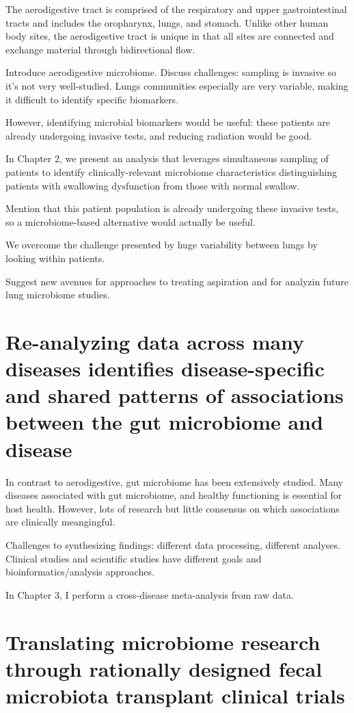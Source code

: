 The aerodigestive tract is comprised of the respiratory and upper gastrointestinal tracts and includes the oropharynx, lungs, and stomach.
Unlike other human body sites, the aerodigestive tract is unique in that all sites are connected and exchange material through bidirectional flow.


Introduce aerodigestive microbiome. Discuss challenges: sampling is invasive so it's not very well-studied. Lungs communities especially are very variable, making it difficult to identify specific biomarkers.

However, identifying microbial biomarkers would be useful: these patients are already undergoing invasive tests, and reducing radiation would be good.

In Chapter 2, we present an analysis that leverages simultaneous sampling of patients to identify clinically-relevant microbiome characteristics distinguishing patients with swallowing dysfunction from those with normal swallow.

Mention that this patient population is already undergoing these invasive tests, so a microbiome-based alternative would actually be useful.

We overcome the challenge presented by huge variability between lungs by looking within patients.

Suggest new avenues for approaches to treating aspiration and for analyzin future lung microbiome studies.

\section{Re-analyzing data across many diseases identifies disease-specific and shared patterns of associations between the gut microbiome and disease}

In contrast to aerodigestive, gut microbiome has been extensively studied. Many diseases associated with gut microbiome, and healthy functioning is essential for host health. However, lots of research but little consensus on which associations are clinically meangingful.

Challenges to synthesizing findings: different data processing, different analyses. Clinical studies and scientific studies have different goals and bioinformatics/analysis approaches.

In Chapter 3, I perform a cross-disease meta-analysis from raw data.

\section{Translating microbiome research through rationally designed fecal microbiota transplant clinical trials}


